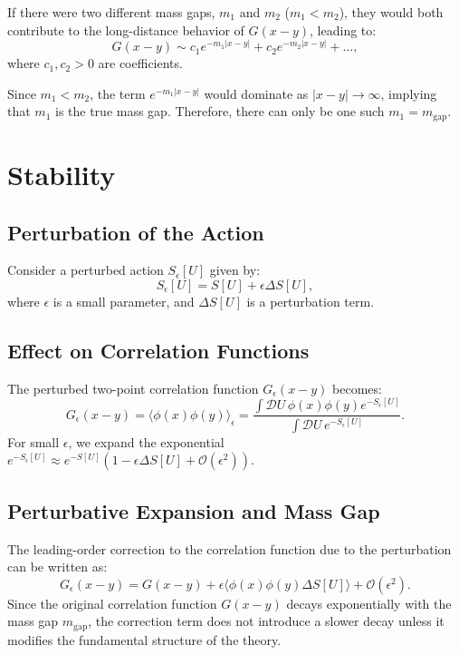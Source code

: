 If there were two different mass gaps, \(m_1\) and \(m_2\) (\(m_1 < m_2\)), they would both contribute to the long-distance behavior of \(G(x-y)\), leading to:
\begin{equation}
G(x-y) \sim c_1 e^{-m_1 |x-y|} + c_2 e^{-m_2 |x-y|} + \ldots,
\end{equation}
where \(c_1, c_2 > 0\) are coefficients.

Since \(m_1 < m_2\), the term \(e^{-m_1 |x-y|}\) would dominate as \(|x-y| \to \infty\), implying that \(m_1\) is the true mass gap. Therefore, there can only be one such \(m_1 = m_{\text{gap}}\).



\section{Stability}

\subsection{Perturbation of the Action}

Consider a perturbed action \(S_\epsilon[U]\) given by:
\begin{equation}
S_\epsilon[U] = S[U] + \epsilon \Delta S[U],
\end{equation}
where \(\epsilon\) is a small parameter, and \(\Delta S[U]\) is a perturbation term.

\subsection{Effect on Correlation Functions}

The perturbed two-point correlation function \(G_\epsilon(x-y)\) becomes:
\begin{equation}
G_\epsilon(x-y) = \langle \phi(x) \phi(y) \rangle_\epsilon = \frac{\int \mathcal{D}U \, \phi(x) \phi(y) e^{-S_\epsilon[U]}}{\int \mathcal{D}U \, e^{-S_\epsilon[U]}}.
\end{equation}
For small \(\epsilon\), we expand the exponential \(e^{-S_\epsilon[U]} \approx e^{-S[U]} (1 - \epsilon \Delta S[U] + \mathcal{O}(\epsilon^2))\).

\subsection{Perturbative Expansion and Mass Gap}

The leading-order correction to the correlation function due to the perturbation can be written as:
\begin{equation}
G_\epsilon(x-y) = G(x-y) + \epsilon \langle \phi(x) \phi(y) \Delta S[U] \rangle + \mathcal{O}(\epsilon^2).
\end{equation}
Since the original correlation function \(G(x-y)\) decays exponentially with the mass gap \(m_{\text{gap}}\), the correction term does not introduce a slower decay unless it modifies the fundamental structure of the theory.

